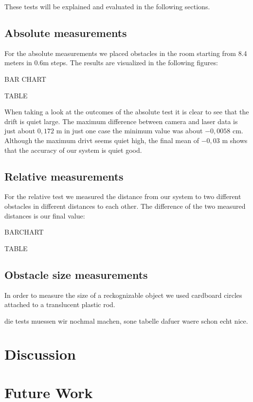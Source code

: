 \documentclass[11pt]{article}
\begin{document}
These tests will be explained and evaluated in the following sections.

\subsection{Absolute measurements}
For the absolute measurements we placed obstacles in the room starting from 8.4 meters in 0.6m steps. The results are visualized in the following figures:

BAR CHART

TABLE 

When taking a look at the outcomes of the absolute test it is clear to see that the drift is quiet large. The maximum difference between camera and laser data is just about $0,172$ m in just one case the minimum value was about $-0,0058$ cm. Although the maximum drivt seems quiet high, the final mean of $-0,03$ m shows that the accuracy of our system is quiet good.

\subsection{Relative measurements}
For the relative test we measured the distance from our system to two different obstacles in different distances to each other. The difference of the two measured distances is our final value:

BARCHART

TABLE

\subsection{Obstacle size measurements}
In order to measure the size of a reckognizable object we used cardboard circles attached to a translucent plastic rod.

die tests muessen wir nochmal machen, sone tabelle dafuer waere schon echt nice.


\section{Discussion}
\section{Future Work}
\end{document}
